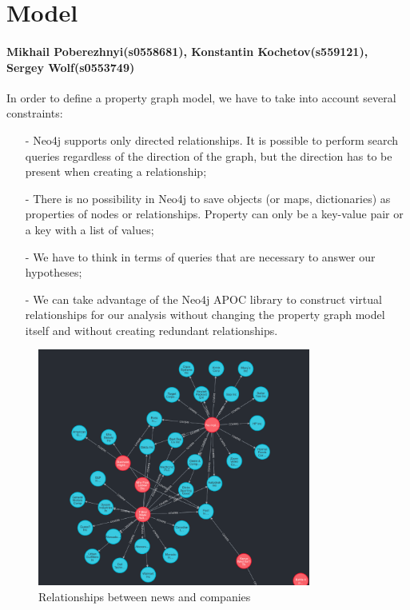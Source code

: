 \chapter{Model}
\subsubsection*{Mikhail Poberezhnyi(s0558681), Konstantin Kochetov(s559121), Sergey Wolf(s0553749)}
\label{cha:model}

In order to define a property graph model, we have to take into account several constraints:

\begin{itemize}
\item[-] Neo4j supports only directed relationships. It is possible to perform search queries regardless of the direction of the graph, but the direction has to be present when creating a relationship;
\item[-] There is no possibility in Neo4j to save objects (or maps, dictionaries) as properties of nodes or relationships. Property can only be a key-value pair or a key with a list of values;
\item[-] We have to think in terms of queries that are necessary to answer our hypotheses;
\item[-] We can take advantage of the Neo4j APOC library to construct virtual relationships for our analysis without changing the property graph model itself and without creating redundant relationships.
\end{itemize}

\begin{figure}[h]
 \centering
 \includegraphics[width=0.8\textwidth]{images/virtual-relationship-between-nodes.png}
 \caption{Relationships between news and companies }
 \label{fig:virtual-relationship-nodes}
\end{figure}


